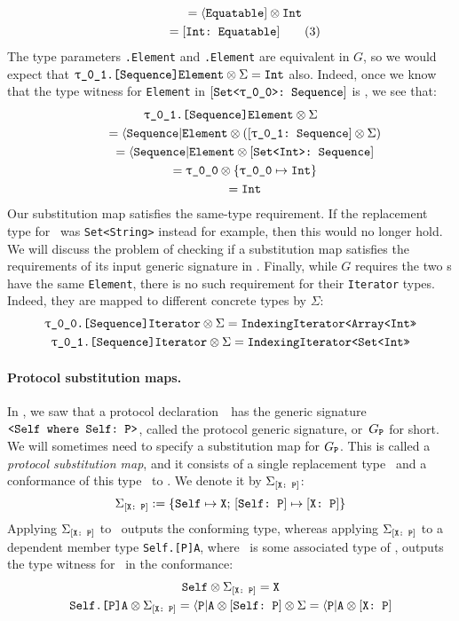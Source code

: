 \documentclass[../generics]{subfiles}
\begin{document}
\begin{example}
\begin{gather*}
\qquad {} = \langle\texttt{Equatable}] \otimes \texttt{Int}\\
\qquad {} = [\texttt{Int:~Equatable}]\tag{3}
\end{gather*}
The type parameters \texttt{\rT.Element} and \texttt{\rU.Element} are equivalent in $G$, so we would expect that $\texttt{\rU.[Sequence]Element}\otimes\Sigma=\texttt{Int}$ also. Indeed, once we know that the type witness for \texttt{Element} in $\ConfReq{Set<\rT>}{Sequence}$ is \rT, we see that:
\begin{gather*}
\texttt{\rU.[Sequence]Element}\otimes\Sigma\\
\qquad {} = \AElement \otimes (\ConfReq{\rU}{Sequence} \otimes \Sigma)\\
\qquad {} = \AElement \otimes \ConfReq{Set<Int>}{Sequence}\\
\qquad {} = \rT \otimes \SubMapInt\\
\qquad {} = \texttt{Int}
\end{gather*}
Our substitution map satisfies the same-type requirement. If the replacement type for \rU\ was \texttt{Set<String>} instead for example, then this would no longer hold. We will discuss the problem of checking if a substitution map satisfies the requirements of its input generic signature in . Finally, while $G$ requires the two \tSequence{}s have the same \texttt{Element}, there is no such requirement for their \texttt{Iterator} types. Indeed, they are mapped to different concrete types by $\Sigma$:
\begin{gather*}
\texttt{\rT.[Sequence]Iterator}\otimes\Sigma = \texttt{IndexingIterator<Array<Int>>}\\
\texttt{\rU.[Sequence]Iterator}\otimes\Sigma = \texttt{IndexingIterator<Set<Int>>}
\end{gather*}
\end{example}
\paragraph{Protocol substitution maps.}
In , we saw that a protocol declaration~\tP\ has the generic signature $\verb|<Self where Self: P>|$, called the protocol generic signature, or~$G_{\texttt{P}}$ for short. We will sometimes need to specify a substitution map for $G_{\texttt{P}}$. This is called a \emph{protocol substitution map}, and it consists of a single replacement type \tX\, and a conformance of this type \tX\ to \tP. We denote it by $\Sigma_{[\texttt{X:~P}]}$:
\[\Sigma_{[\texttt{X:~P}]} := \{
\texttt{Self} \mapsto \texttt{X}
;\,
[\texttt{Self:~P}] \mapsto [\texttt{X:~P}]
\}\]
Applying $\Sigma_{[\texttt{X:~P}]}$ to \tSelf\ outputs the conforming type, whereas applying $\Sigma_{[\texttt{X:~P}]}$ to a dependent member type \texttt{Self.[P]A}, where \nA\ is some associated type of \tP, outputs the type witness for \nA\ in the conformance:
\begin{gather*}
\texttt{Self} \otimes \Sigma_{[\texttt{X:~P}]} = \texttt{X}\\
\texttt{Self.[P]A}\otimes\Sigma_{[\texttt{X:~P}]}=\langle\texttt{P}|\texttt{A}\otimes[\texttt{Self:~P}]\otimes\Sigma=\langle\texttt{P}|\texttt{A}\otimes[\texttt{X:~P}]
\end{gather*}
\end{document}
